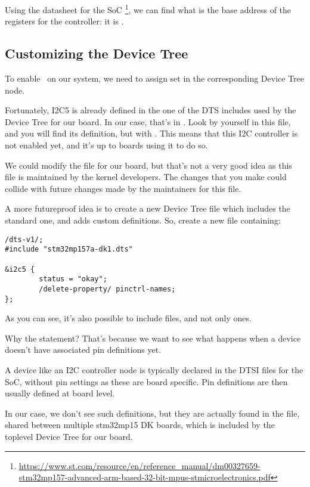 {Using the datasheet for the SoC
\footnote{\url{https://www.st.com/resource/en/reference_manual/dm00327659-stm32mp157-advanced-arm-based-32-bit-mpus-stmicroelectronics.pdf}},
we can find what is the base address of the registers for the
 controller: it is .

\subsection{Customizing the Device Tree}

To enable \busname\ on our system, we need to assign set  in the corresponding Device Tree node.

Fortunately, I2C5 is already defined in the one of the DTS includes
used by the Device Tree for our board. In our case, that's in
. Look by yourself in this
file, and you will find its definition, but with . This means that this I2C controller is not enabled yet,
and it's up to boards using it to do so.

We could modify the  file
for our board, but that's not a very good idea as this file is
maintained by the kernel developers. The changes that you make could
collide with future changes made by the maintainers for this file.

A more futureproof idea is to create a new Device Tree file which
includes the standard one, and adds custom definitions. So, create a
new  file containing:

\begin{verbatim}
/dts-v1/;
#include "stm32mp157a-dk1.dts"

&i2c5 {
        status = "okay";
        /delete-property/ pinctrl-names;
};
\end{verbatim}

As you can see, it's also possible to include  files, and not
only  ones.

Why the  statement? That's because we want
to see what happens when a device doesn't have associated pin
definitions yet.

A device like an I2C controller node is typically declared in the DTSI
files for the SoC, without pin settings as these are board
specific. Pin definitions are then usually defined at board level.

In our case, we don't see such definitions, but they are actually
found in the 
file, shared between multiple stm32mp15 DK boards, which is included
by the toplevel Device Tree for our board.

}
